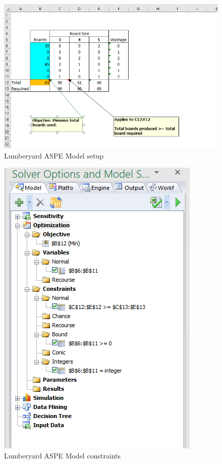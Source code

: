 \documentclass[]{article}
\begin{document}
\begin{figure}
\centering
\includegraphics{Figures/Homework3/pEC.PNG}
\caption{Lumberyard ASPE Model setup}
\end{figure}

\begin{figure}
\centering
\includegraphics{Figures/Homework3/modelpEC.PNG}
\caption{Lumberyard ASPE Model constraints}
\end{figure}
\end{document}
